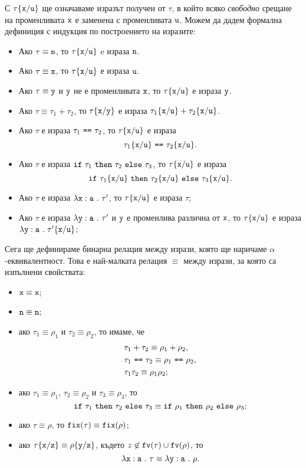 С $\tau\{\texttt{x}/\texttt{u}\}$ ще означаваме изразът получен от $\tau$, в който всяко \emph{свободно} срещане на променливата $\texttt{x}$
е заменена с променливата $\texttt{u}$. Можем да дадем формална дефиниция с индукция по построението на изразите:
\begin{itemize}
\item
  Ако $\tau \equiv \texttt{n}$, то $\tau\{\texttt{x}/\texttt{u}\}$ e израза $\texttt{n}$.
\item
  Ако $\tau \equiv \texttt{x}$, то $\tau\{\texttt{x}/\texttt{u}\}$ е израза $\texttt{u}$.
\item
  Ако $\tau \equiv \texttt{y}$ и $\texttt{y}$ не е променливата $\texttt{x}$, то $\tau\{\texttt{x}/\texttt{u}\}$ е израза $\texttt{y}$.
\item
  Ако $\tau \equiv \tau_1 + \tau_2$, то
  $\tau\{\texttt{x}/\texttt{y}\}$ е израза $\tau_1\{\texttt{x}/\texttt{u}\} + \tau_2\{\texttt{x}/\texttt{u}\}$.
\item
  Ако $\tau$ е израза $\tau_1\ \texttt{==}\ \tau_2$, то $\tau\{\texttt{x}/\texttt{u}\}$ е израза
  \[\tau_1\rename{x}{u}\ \vv{==}\ \tau_2\rename{x}{u}.\]
\item
  Ако $\tau$ е израза $\texttt{if}\ \tau_1\ \texttt{then}\ \tau_2\ \texttt{else}\ \tau_3$, то $\tau\{\texttt{x}/\texttt{u}\}$ е израза
  \[\texttt{if}\ \tau_1\{\texttt{x}/\texttt{u}\}\ \texttt{then}\ \tau_2\{\texttt{x}/\texttt{u}\}\ \texttt{else}\ \tau_3\{\texttt{x}/\texttt{u}\}.\]
\item
  Ако $\tau$ е израза $\lambda\texttt{x}:\texttt{a}\ .\ {\tau'}$, то
  $\tau\{\texttt{x}/\texttt{u}\}$ е израза $\tau$;
\item
  Ако $\tau$ е израза $\lambda\texttt{y}:\texttt{a}\ .\ {\tau'}$ и $\texttt{y}$ е променлива различна от $\texttt{x}$, то
  $\tau\{\texttt{x}/\texttt{u}\}$ е израза $\lambda\texttt{y}:\texttt{a}\ .\ {\tau'\{\texttt{x}/\texttt{u}\}}$;
\end{itemize}

Сега ще дефинираме бинарна релация между изрази, която ще наричаме $\alpha$-еквивалентност.
Това е най-малката релация $\equiv$ между изрази, за която са изпълнени свойствата:
\begin{itemize}
\item
  $\texttt{x} \equiv \texttt{x}$;
\item
  $\texttt{n} \equiv \texttt{n}$;
\item
  ако $\tau_1 \equiv \rho_1$ и $\tau_2 \equiv \rho_2$, то имаме, че
  \begin{align*}
    & \tau_1 + \tau_2 \equiv \rho_1 + \rho_2,\\
    & \tau_1\ \texttt{==}\ \tau_2 \equiv \rho_1\ \texttt{==}\ \rho_2,\\
    & \tau_1 \tau_2 \equiv \rho_1 \rho_2;
  \end{align*}
\item
  ако $\tau_1 \equiv \rho_1$, $\tau_2 \equiv \rho_2$ и $\tau_3 \equiv \rho_3$, то
  \[\texttt{if}\ \tau_1\ \texttt{then}\ \tau_2\ \texttt{else}\ \tau_3 \equiv \texttt{if}\ \rho_1\ \texttt{then}\ \rho_2\ \texttt{else}\ \rho_3;\]
\item
  ако $\tau \equiv \rho$, то $\texttt{fix}(\tau) \equiv \texttt{fix}(\rho)$;
\item
  ако $\tau\{\texttt{x}/\texttt{z}\} \equiv \rho\{\texttt{y}/\texttt{z}\}$, където $z \not\in \texttt{fv}(\tau) \cup \texttt{fv}(\rho)$, то
  \[\lambda\texttt{x}:\texttt{a}\ .\ {\tau} \equiv \lambda\texttt{y}:\texttt{a}\ .\ {\rho}.\]
\end{itemize}

